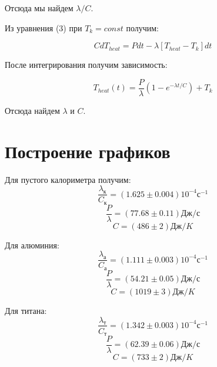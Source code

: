 \documentclass[a4paper]{article}
\begin{document}
Отсюда мы найдем $\lambda/C$.

Из уравнения (3) при $T_k = const$ получим:

\begin{equation}
    CdT_{heat} = Pdt - \lambda \left[ T_{heat} - T_k \right] dt
\end{equation}

После интегрирования получим зависимость:

\begin{equation}
    T_{heat}(t) = \frac{P}{\lambda} \left( 1 - e^{- \lambda t / C} \right) + T_k
\end{equation}

Отсюда найдем $\lambda$ и $C$.

\section{Построение графиков}

Для пустого калориметра получим:
\begin{equation*}
    \frac{\lambda_\text{к}}{C_\text{к}} = \left( 1.625 \pm 0.004 \right) 10^{-4} \text{с}^{-1}
\end{equation*}
\begin{equation*}
    \frac{P}{\lambda} = \left( 77.68 \pm 0.11 \right) \text{Дж}/\text{с}
\end{equation*}
\begin{equation*}
    C = (486 \pm 2) \text{Дж}/K
\end{equation*}

Для алюминия: 
\begin{equation*}
    \frac{\lambda_\text{а}}{C_\text{а}} = \left( 1.111 \pm 0.003 \right) 10^{-4} \text{с}^{-1}
\end{equation*}
\begin{equation*}
    \frac{P}{\lambda} = \left( 54.21 \pm 0.05 \right) \text{Дж}/\text{с}
\end{equation*}
\begin{equation*}
    C = (1019 \pm 3) \text{Дж}/K
\end{equation*}

Для титана:
\begin{equation*}
    \frac{\lambda_\text{т}}{C_\text{т}} = \left( 1.342 \pm 0.003 \right) 10^{-4} \text{с}^{-1}
\end{equation*}
\begin{equation*}
    \frac{P}{\lambda} = \left( 62.39 \pm 0.06 \right) \text{Дж}/\text{с}
\end{equation*}
\begin{equation*}
    C = (733 \pm 2) \text{Дж}/K
\end{equation*}
\end{document}
